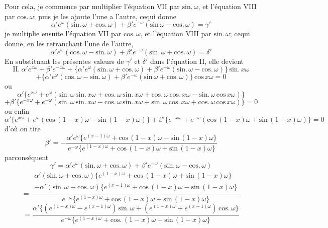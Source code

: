 \documentclass[11pt,a4paper]{article}
\begin{document}
Pour cela, je commence par multiplier l'équation VII par $\text{sin.}\,\omega$, et l'équation VIII
par $\text{cos.}\,\omega$; puis je les ajoute l'une a l'autre, cequi donne
\[ \alpha' e^{\omega}(\text{sin.}\,\omega + \text{cos.}\,\omega) + \beta' e^{-\omega}(\text{sin}\,\omega - \text{cos.}\,\omega) = \gamma' \]
je multiplie ensuite l'équation VII par $\text{cos.}\,\omega$, et l'équation VIII par $\text{sin.}\,\omega$; cequi donne,
en les retranchant l'une de l'autre,
\[ \alpha' e^{\omega}(\text{cos.}\,\omega - \text{sin.}\,\omega) + \beta' e^{-\omega}(\text{sin.}\,\omega + \text{cos.}\,\omega) = \delta' \]
En substituant les présentes valeurs de $\gamma'$ et $\delta'$ dans l'équation II, elle devient
\[ \text{II.}\ \alpha' e^{x\omega} + \beta' e^{-x\omega} + \{\alpha' e^{\omega}(\text{sin.}\,\omega + \text{cos.}\,\omega) + \beta' e^{-\omega}(\text{sin.}\,\omega - \text{cos.}\,\omega)\}\,\text{sin.}\,x\omega \]
\[ + \{\alpha' e^{\omega}(\text{cos.}\,\omega - \text{sin.}\,\omega) + \beta' e^{-\omega}(\text{sin}\,\omega + \text{cos.}\,\omega)\}\,\text{cos}\,x\omega = 0 \]
ou
\[ \alpha'\{e^{x\omega} + e^{\omega}(\text{sin.}\,\omega\,\text{sin.}\,x\omega + \text{cos.}\,\omega\,\text{sin.}\,x\omega + \text{cos.}\,\omega\,\text{cos.}\,x\omega - \text{sin.}\,\omega\,\text{cos}\,x\omega)\} \]
\[ + \beta'\{e^{-x\omega} + e^{-\omega}(\text{sin.}\,\omega\,\text{sin.}\,x\omega - \text{cos.}\,\omega\,\text{sin.}\,x\omega + \text{sin.}\,\omega\,\text{cos.}\,x\omega + \text{cos.}\,\omega\,\text{cos}\,x\omega)\} = 0 \]
ou enfin
\[ \alpha'\{e^{x\omega} + e^{\omega}(\text{cos}\,(1-x)\omega - \text{sin}\,(1-x)\omega)\} + \beta'\{e^{-x\omega} + e^{-\omega}(\text{cos}\,(1-x)\omega + \text{sin}\,(1-x)\omega)\} = 0 \]
d'où on tire
\[ \beta' = -\frac{\alpha' e^{\omega}\{e^{(x-1)\omega} + \text{cos}\,(1-x)\omega - \text{sin}\,(1-x)\omega\}}{e^{-\omega}\{e^{(1-x)\omega} + \text{cos}\,(1-x)\omega + \text{sin}\,(1-x)\omega\}} \]
parconséquent
\[ \gamma' = \alpha' e^{\omega}(\text{sin.}\,\omega + \text{cos.}\,\omega) + \beta' e^{-\omega}(\text{sin.}\,\omega - \text{cos.}\,\omega) \]
\[ = \frac{\begin{array}{c}\alpha'(\text{sin.}\,\omega + \text{cos.}\,\omega)\{e^{(1-x)\omega} + \text{cos}\,(1-x)\omega + \text{sin}\,(1-x)\omega\} \\  - \alpha'(\text{sin.}\,\omega - \text{cos.}\,\omega)\{e^{(x-1)\omega} + \text{cos}\,(1-x)\omega - \text{sin}\,(1-x)\omega\}\end{array}}{e^{-\omega}\{e^{(1-x)\omega} + \text{cos}\,(1-x)\omega + \text{sin}\,(1-x)\omega\}} \]
\[ = \frac{\alpha'\{(e^{(1-x)\omega} - e^{(x-1)\omega})\,\text{sin.}\,\omega + (e^{(1-x)\omega} + e^{(x-1)\omega})\,\text{cos.}\,\omega\}}{e^{-\omega}\{e^{(1-x)\omega} + \text{cos.}\,(1-x)\omega + \text{sin}\,(1-x)\omega\}} \]
\end{document}
